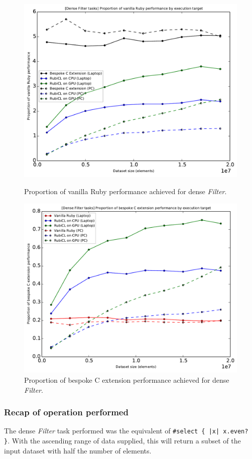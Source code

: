 \begin{figure}[H]
  \centering
  \includegraphics[width=\textwidth]{./graphing/dense_filter/prop_van.pdf}
  \caption{Proportion of vanilla Ruby performance achieved for dense \emph{Filter}.}
  \label{fig:dfilter_task_vperf_g}

  \includegraphics[width=\textwidth]{./graphing/dense_filter/prop_bes.pdf}
  \caption{Proportion of bespoke C extension performance achieved for dense \emph{Filter}.}
  \label{fig:dfilter_task_bperf_g}
\end{figure}
\subsubsection{Recap of operation performed}
The dense \emph{Filter} task performed was the equivalent of \verb!#select { |x| x.even? }!. With the ascending range of data supplied, this will return a subset of the input dataset with half the number of elements.

